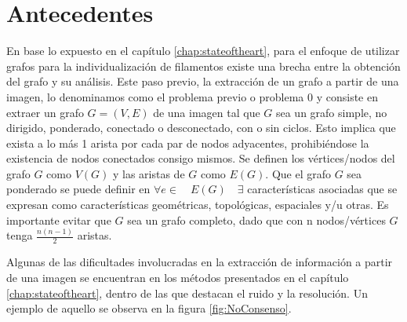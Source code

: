 \chapter{Antecedentes}
\label{chap:cap2}


En base lo expuesto en el cap\'itulo \ref{chap:stateoftheart}, para el enfoque de utilizar grafos para la individualizaci\'on de filamentos existe una brecha entre la obtenci\'on del grafo y su an\'alisis. Este paso previo, la extracci\'on de un grafo a partir de una imagen, lo denominamos como el problema previo o problema 0 y consiste en extraer un grafo $G = (V,E)$ de una imagen tal que $G$ sea un grafo simple, no dirigido, ponderado, conectado o desconectado, con o sin ciclos. Esto implica que exista a lo m\'as 1 arista por cada par de nodos adyacentes, prohibi\'endose la existencia de nodos conectados consigo mismos. Se definen los v\'ertices/nodos del grafo $G$ como $V(G)$ y las aristas de $G$ como $E(G)$. 
Que el grafo $G$ sea ponderado se puede definir en $\forall e \in \quad E(G) \quad  \exists $ caracter\'isticas asociadas que se expresan como caracter\'isticas geom\'etricas, topol\'ogicas, espaciales y/u otras. Es importante evitar que $G$ sea un grafo completo, dado que con n nodos/v\'ertices $G$ tenga $\frac{n(n-1)}{2}$ aristas. 

Algunas de las dificultades involucradas en la extracci\'on de informaci\'on a partir de una imagen se encuentran en los m\'etodos presentados en el cap\'itulo \ref{chap:stateoftheart}, dentro de las que destacan el ruido y la resoluci\'on. Un ejemplo de aquello se observa en la figura \ref{fig:NoConsenso}.

